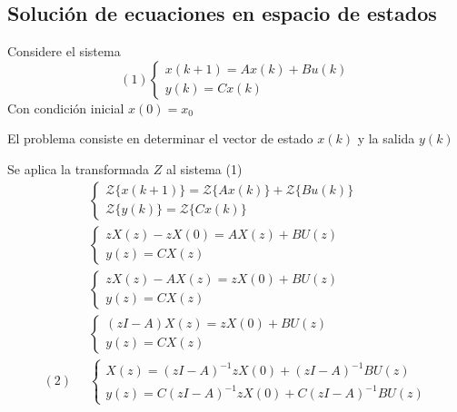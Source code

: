 \subsection{Solución de ecuaciones en espacio de estados}

Considere el sistema
\[
    (1)
    \left\{
        \begin{array}{lll}
            x(k+1)= Ax(k) + Bu(k)\\
            y(k) = Cx(k)
        \end{array}
    \right.
\]
Con condición inicial \( x(0) = x_{0} \)

El problema consiste en determinar el vector de estado \( x(k) \) y la salida \( y(k) \)

Se aplica la transformada \( Z \) al sistema (1)
\[
    \begin{split}
        &\left\{
        \begin{array}{lll}
            \mathcal{Z} \{ x(k+1) \}= \mathcal{Z} \{ Ax(k) \} + \mathcal{Z} \{ Bu(k) \}\\
            \mathcal{Z} \{ y(k) \} = \mathcal{Z} \{ Cx(k) \}
        \end{array}
        \right. \\
        &\left\{
            \begin{array}{lll}
                zX(z) -zX(0) = AX(z) + BU(z) \\
                y(z) = CX(z)
            \end{array}
        \right. \\
        &\left\{
            \begin{array}{lll}
                zX(z) - AX(z) = zX(0) + BU(z) \\
                y(z) = CX(z)
            \end{array}
        \right. \\
        &\left\{
            \begin{array}{lll}
                (zI-A)X(z) = zX(0) + BU(z) \\
                y(z) = CX(z)
            \end{array}
        \right. \\
        (2) \;\; &\left\{
            \begin{array}{lll}
                X(z) = (zI-A)^{-1}zX(0) + (zI-A)^{-1}BU(z) \\
                y(z) = C(zI-A)^{-1}zX(0) + C(zI-A)^{-1}BU(z)
            \end{array}
        \right.
        \end{split}
\]

